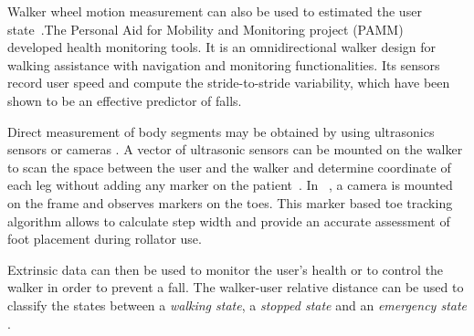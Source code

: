 \documentclass[letterpaper, 10 pt, conference]{ieeeconf}
\begin{document}
Walker wheel motion measurement can also be used to estimated the user state~\cite{Spenko06,Merlet10b}.The Personal Aid for Mobility and Monitoring project (PAMM)~\cite{Spenko06} developed health monitoring tools. It is an omnidirectional walker design for walking assistance with navigation and monitoring functionalities. Its sensors record user speed and compute the stride-to-stride variability, which have been shown to be an effective predictor of falls.%

Direct measurement of body segments may be obtained by using ultrasonics sensors or cameras \cite{Frizera08,Chee09}. A vector of ultrasonic sensors can be mounted on the walker to scan the space between the user and the walker and determine coordinate of each leg without adding any marker on the patient~\cite{Frizera08}. In ~\cite{Chee09}, a camera is mounted on the frame and observes markers on the toes. This marker based toe tracking algorithm allows to calculate step width and provide an accurate assessment of foot placement during rollator use.
  

Extrinsic data can then be used to monitor the user's health or to control the walker in order to prevent a fall. The walker-user relative distance can be used to classify the states between a \textit{walking state}, a \textit{stopped state }and an \textit{emergency state} \cite{Hirata2006}. %
\end{document}
